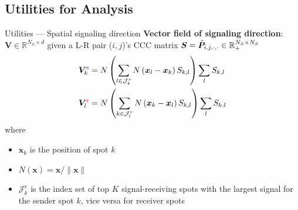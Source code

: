\documentclass[10pt]{beamer}
\begin{document}




\subsection{Utilities for Analysis}
\begin{frame}{Utilities
--- Spatial signaling direction}
    \textbf{Vector field of signaling direction}: $\bm{V}\in\mathbb{R}^{N_S\times d}$ given a L-R pair ($i,j$)'s CCC matrix $\bm{S}=\Tilde{\bm{P}}_{i,j,\cdot,\cdot}\in\mathbb{R}_+^{N_S\times N_S}$
    \begin{align}
        \bm{V}_{k}^\text{{\color{blue}s}}
        & = N\left(\sum_{l\in\mathcal{J}^{s}_k}N\left(\bm{x}_l-\bm{x}_k\right)S_{k,l}\right)\sum_l S_{k,l}\\
        \bm{V}_{l}^\text{{\color{red}r}}
        & = N\left(\sum_{k\in\mathcal{J}^{r}_l}N\left(\bm{x}_k-\bm{x}_l\right)S_{k,l}\right)\sum_l S_{k.l}
    \end{align}
    where \begin{itemize}
        \item $\bm{x}_k$ is the position of spot $k$
        \item $N(\bm{x})={\bm{x}}/{\|\bm{x}\|}$
        \item $\mathcal{J}^\text{s}_k$ is the index set of top $K$ signal-receiving spots 
        with the largest signal for the sender spot $k$, vice versa for receiver spots
    \end{itemize}
\end{frame}
\end{document}
